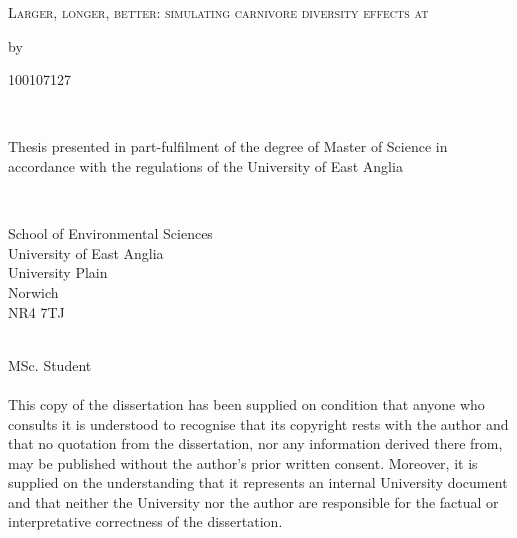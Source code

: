 \begin{titlepage}
\vspace{5cm}

\begin{center}
\begin{Large}
\textsc{Larger, longer, better: simulating carnivore diversity effects at}\\
\end{Large}
\vspace{1.5cm}
by
\\
\vspace{1.5cm}
\begin{large}
100107127
\end{large}
\\
\vspace{2cm}
\begin{large}
Thesis presented in part-fulfilment of the degree of Master of Science in accordance with the
regulations of the University of East Anglia
\end{large}
\\
\end{center}
\vspace{7cm}
\begin{small}
School of Environmental Sciences\\
University of East Anglia\\
University Plain\\
Norwich\\
NR4 7TJ\\
\end{small}
\\
\small
{} MSc. Student\\\\
This copy of the dissertation has been supplied on condition that anyone who consults it is understood to recognise that 
its copyright rests with the author and that no quotation from the dissertation, nor any information derived there from, may 
be published without the author’s prior written consent. Moreover, it is supplied on the understanding that it represents an 
internal University document and that neither the University nor the author are responsible for the factual or interpretative 
correctness of the dissertation.
\end{titlepage}